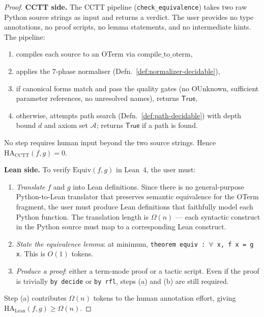 \begin{proof}
\textbf{CCTT side.}
The CCTT pipeline (\texttt{check\_equivalence}) takes two raw Python
source strings as input and returns a verdict.  The user provides
no type annotations, no proof scripts, no lemma statements, and no
intermediate hints.  The pipeline:
\begin{enumerate}[label=(\roman*)]
  \item compiles each source to an OTerm via
    $\mathrm{compile\_to\_oterm}$,
  \item applies the 7-phase normaliser (Defn.~\ref{def:normalizer-decidable}),
  \item if canonical forms match and pass the quality gates
    (no OUnknown, sufficient parameter references, no unresolved
    names), returns $\mathsf{True}$,
  \item otherwise, attempts path search (Defn.~\ref{def:path-decidable})
    with depth bound $d$ and axiom set $\mathcal{A}$;
    returns $\mathsf{True}$ if a path is found.
\end{enumerate}
No step requires human input beyond the two source strings.  Hence
$\mathrm{HA}_{\mathrm{CCTT}}(f,g) = 0$.

\textbf{Lean side.}
To verify $\mathrm{Equiv}(f, g)$ in Lean~4, the user must:
\begin{enumerate}[label=(\alph*)]
  \item \emph{Translate} $f$ and $g$ into Lean definitions.  Since
    there is no general-purpose Python-to-Lean translator that
    preserves semantic equivalence for the OTerm fragment, the user
    must produce Lean definitions that faithfully model each Python
    function.  The translation length is $\Omega(n)$ — each
    syntactic construct in the Python source must map to a
    corresponding Lean construct.
  \item \emph{State the equivalence lemma}: at minimum,
    \texttt{theorem equiv : $\forall$ x, f x = g x}.  This is $O(1)$
    tokens.
  \item \emph{Produce a proof}: either a term-mode proof or a tactic
    script.  Even if the proof is trivially \texttt{by decide} or
    \texttt{by rfl}, steps (a) and (b) are still required.
\end{enumerate}
Step (a) contributes $\Omega(n)$ tokens to the human annotation
effort, giving $\mathrm{HA}_{\mathrm{Lean}}(f,g) \geq \Omega(n)$.
\end{proof}

